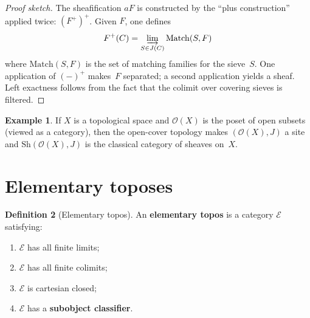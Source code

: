 \documentclass[a4paper,12pt]{book}
\theoremstyle{definition}
\newtheorem{definition}{Definition}[section]
\newtheorem{example}[definition]{Example}
\theoremstyle{plain}
\theoremstyle{remark}
\begin{document}
\begin{proof}[Proof sketch]
The sheafification $aF$ is constructed by the ``plus construction''
applied twice: $(F^+)^+$.  Given $F$, one defines
\[
    F^+(C) = \varinjlim_{S\in J(C)} \mathrm{Match}(S, F)
\]
where $\mathrm{Match}(S,F)$ is the set of matching families for the
sieve~$S$.  One application of $(-)^+$ makes~$F$ separated; a second
application yields a sheaf.  Left exactness follows from the fact that
the colimit over covering sieves is filtered.
\end{proof}

\begin{example}\label{ex:sheaves-on-space}
If $X$ is a topological space and $\mathcal{O}(X)$ is the poset of
open subsets (viewed as a category), then the open-cover topology makes
$(\mathcal{O}(X), J)$ a site and $\mathrm{Sh}(\mathcal{O}(X), J)$ is
the classical category of sheaves on~$X$.
\end{example}



\section{Elementary toposes}\label{sec:elementary-topos}


\begin{definition}[Elementary topos]\label{def:elementary-topos}
An \textbf{elementary topos} is a category $\mathcal{E}$ satisfying:
\begin{enumerate}[label=(\roman*)]
\item $\mathcal{E}$ has all finite limits;
\item $\mathcal{E}$ has all finite colimits;
\item $\mathcal{E}$ is cartesian closed;
\item $\mathcal{E}$ has a \textbf{subobject classifier}.
\end{enumerate}
\end{definition}
\end{document}
